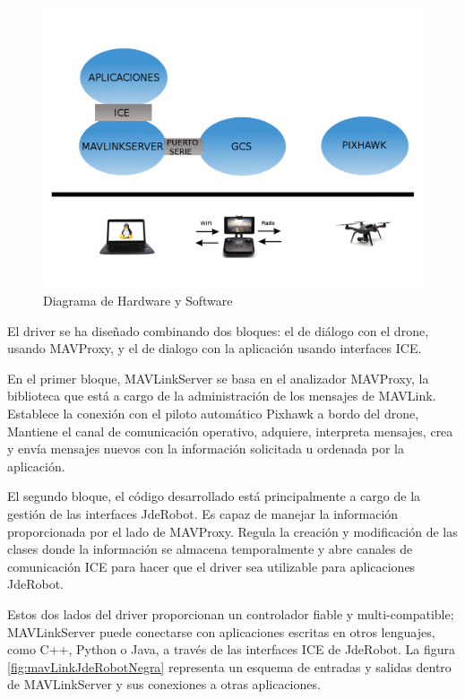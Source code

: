 \begin{figure}[H]
  \centering
  \includegraphics[scale=0.2]{imagenes/HWYSW.png}
  \caption{Diagrama de Hardware y Software}
  \label{fig:diagramaHwSw}
\end{figure}

El driver se ha diseñado combinando dos bloques: el de diálogo con el drone, usando MAVProxy, y el de dialogo con la aplicación usando interfaces ICE.

En el primer bloque, MAVLinkServer se basa en el analizador MAVProxy, la biblioteca que está a cargo de la administración de los mensajes de MAVLink. Establece la conexión con el piloto automático Pixhawk a bordo del drone, Mantiene el canal de comunicación operativo, adquiere, interpreta mensajes, crea y envía mensajes nuevos con la información solicitada u ordenada por la aplicación.

El segundo bloque, el código desarrollado está principalmente a cargo de la gestión de las interfaces JdeRobot. Es capaz de manejar la información proporcionada por el lado de MAVProxy. Regula la creación y modificación de las clases donde la información se almacena temporalmente y abre canales de comunicación ICE para hacer que el driver sea utilizable para aplicaciones JdeRobot.

Estos dos lados del driver proporcionan un controlador fiable y multi-compatible; MAVLinkServer puede conectarse con aplicaciones escritas en otros lenguajes, como C++, Python o Java, a través de las interfaces ICE de JdeRobot. La figura \ref{fig:mavLinkJdeRobotNegra} representa un esquema de entradas y salidas dentro de MAVLinkServer y sus conexiones a otras aplicaciones.



